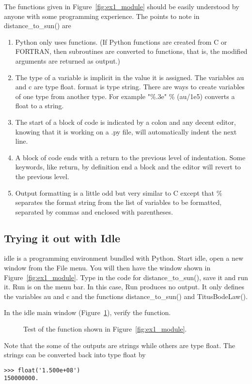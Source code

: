 \documentclass{article}
\begin{document}
The functions given in Figure~\ref{fig:ex1_module} should be easily
understood by anyone with some programming experience.
The points to note in {\ttfamily distance\_to\_sun()} are
\begin{enumerate}
\item Python only uses functions. (If Python functions are created from C or
FORTRAN, then subroutines are converted to functions, that is, the modified
arguments are returned as output.)
\item The type of a variable is implicit in the value it is assigned. The
variables {\ttfamily au} and {\ttfamily c} are type {\ttfamily float}. 
{\ttfamily format} is type {\ttfamily string}. There are ways to create
variables of one type from another type. For example {\ttfamily "\%.3e" \%
(au/1e5)} converts a {\ttfamily float} to a {\ttfamily string}.
\item The start of a block of code is indicated by a colon and any decent
editor, knowing that it is working on a {\ttfamily .py} file, will
automatically indent the next line.
\item A block of code ends with a return to the previous level of indentation.
Some keywords, like {\ttfamily return}, by definition end a block and the editor
will revert to the previous level.
\item Output formatting is a little odd but very similar to C except that
{\ttfamily \%} separates the format string from the list of variables to be
formatted, separated by commas and enclosed with parentheses.
\end{enumerate}

\subsection{Trying it out with Idle}

{\ttfamily idle} is a programming environment bundled with Python.  Start
{\ttfamily idle}, open a new window from the {\ttfamily File} menu.
You will then have the window shown in Figure~\ref{fig:ex1_module}.
Type in the code for {\ttfamily distance\_to\_sun()}, save it and run it.
{\ttfamily Run} is on the menu bar. In this case, Run produces no output.
It only defines the variables {\ttfamily au} and {\ttfamily c} and the
functions {\ttfamily distance\_to\_sun()} and {\ttfamily TitusBodeLaw()}.

In the {\ttfamily idle} main window (Figure~\ref{fig:ex1_idle_win}), verify
the function.
\begin{figure}[h!tb]
\begin{center}
\caption{\label{fig:ex1_idle_win}Test of the function shown in
Figure~\ref{fig:ex1_module}.}
\end{center}
\end{figure}
Note that the some of the outputs are strings while others are type
{\ttfamily float}. The strings can be converted back into  type
{\ttfamily float} by
\begin{verbatim}
>>> float('1.500e+08')
150000000.
\end{verbatim}
\end{document}
